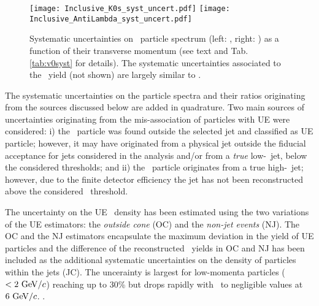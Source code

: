 \begin{figure}[htbp]
	\centering
	\texttt{[image: Inclusive\_K0s\_syst\_uncert.pdf]}
	\texttt{[image: Inclusive\_AntiLambda\_syst\_uncert.pdf]}
	\caption{Systematic uncertainties on \Vzero\ particle spectrum (left: \ks, right: \alda) as a function of their transverse momentum (see text and Tab. \ref{tab:v0syst} for details). The systematic uncertainties associated to the \lda\ yield (not shown) are largely similar to \alda. }
	\label{fig:systUncert}
\end{figure}


The systematic uncertainties on the particle spectra and their ratios originating from the sources discussed below are added in quadrature. 
Two main sources of uncertainties originating from the mis-association of \Vzero particles with UE were considered: i) the \Vzero\ particle was found outside the selected jet and classified as UE particle; however, it may have originated from a physical jet outside the fiducial acceptance for jets considered in the analysis and/or from a {\it true} low-\pt\ jet, below the considered thresholds; and ii) the \Vzero\ particle originates from a true high-\pt\ jet; however, due to the finite detector efficiency the jet has not been reconstructed above the considered \pt\ threshold.

The uncertainty on the UE \Vzero\ density has been estimated using the two variations of the UE estimators: the {\it outside cone} (OC) and the {\it non-jet events} (NJ).
The OC and the NJ estimators encapsulate the maximum deviation in the yield of UE particles and the difference of the reconstructed \Vzero\ yields in OC and NJ has been included as the additional systematic uncertainties on the density of particles within the jets (JC). 
The uncerainty is largest for low-momenta particles ($< 2~\mathrm{GeV}/c$) reaching up to 30\% but drops rapidly with \pt\ to negligible values at $6~\mathrm{GeV}/c$. .

